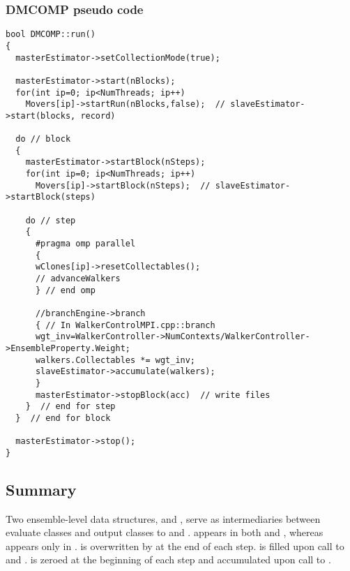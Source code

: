 \subsubsection{DMCOMP  pseudo code}
\begin{lstlisting}
bool DMCOMP::run()
{
  masterEstimator->setCollectionMode(true);
  
  masterEstimator->start(nBlocks);
  for(int ip=0; ip<NumThreads; ip++)
    Movers[ip]->startRun(nBlocks,false);  // slaveEstimator->start(blocks, record)
  
  do // block
  {
    masterEstimator->startBlock(nSteps);
    for(int ip=0; ip<NumThreads; ip++)
      Movers[ip]->startBlock(nSteps);  // slaveEstimator->startBlock(steps)
    
    do // step
    {
      #pragma omp parallel
      {
      wClones[ip]->resetCollectables();
      // advanceWalkers
      } // end omp
      
      //branchEngine->branch
      { // In WalkerControlMPI.cpp::branch
      wgt_inv=WalkerController->NumContexts/WalkerController->EnsembleProperty.Weight;
      walkers.Collectables *= wgt_inv;
      slaveEstimator->accumulate(walkers);
      }
      masterEstimator->stopBlock(acc)  // write files
    }  // end for step
  }  // end for block
  
  masterEstimator->stop();
}
\end{lstlisting}

\subsection{Summary}

Two ensemble-level data structures,  and , serve as intermediaries between evaluate classes and output classes to  and .  appears in both  and , whereas  appears only in .  is overwritten by  at the end of each step.  is filled upon call to  and .  is zeroed at the beginning of each step and accumulated upon call to .

